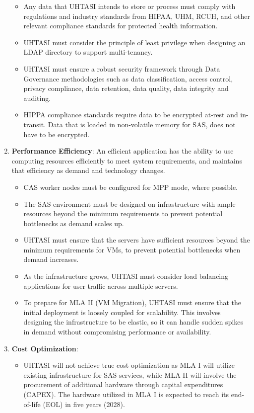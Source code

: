 \begin{enumerate}
\begin{itemize}
        \item Any data that UHTASI intends to store or process must comply with regulations and industry standards from HIPAA, UHM, RCUH, and other relevant compliance standards for protected health information.
        \item UHTASI must consider the principle of least privilege when designing an LDAP directory to support multi-tenancy.
        \item UHTASI must ensure a robust security framework through Data Governance methodologies such as data classification, access control, privacy compliance, data retention, data quality, data integrity and auditing. 
        \item HIPPA compliance standards require data to be encrypted at-rest and in-transit. Data that is loaded in non-volatile memory for SAS, does not have to be encrypted. 
        \end{itemize}
    \item \textbf{\textcolor{Tue-link}{Performance Efficiency}}: An efficient application has the ability to use computing resources efficiently to meet system requirements, and maintains that efficiency as demand and technology changes.
    \begin{itemize}
        \item CAS worker nodes must be configured for MPP mode, where possible. 
        \item The SAS environment must be designed on infrastructure with ample resources beyond the minimum requirements to prevent potential bottlenecks as demand scales up.
        \item UHTASI must ensure that the servers have sufficient resources beyond the minimum requirements for VMs, to prevent potential bottlenecks when demand increases. 
        \item As the infrastructure grows, UHTASI must consider load balancing applications for user traffic across multiple servers. 
        \item To prepare for MLA II (VM Migration), UHTASI must ensure that the initial deployment is loosely coupled for scalability. This involves designing the infrastructure to be elastic, so it can handle sudden spikes in demand without compromising performance or availability.
    \end{itemize}
    \item \textbf{\textcolor{Tue-link}{Cost Optimization}}:
    \begin{itemize}
        \item UHTASI will not achieve true cost optimization as MLA I will utilize existing infrastructure for SAS services, while MLA II will involve the procurement of additional hardware through capital expenditures (CAPEX). The hardware utilized in MLA I is expected to reach its end-of-life (EOL) in five years (2028).
    \end{itemize}
\end{enumerate}

